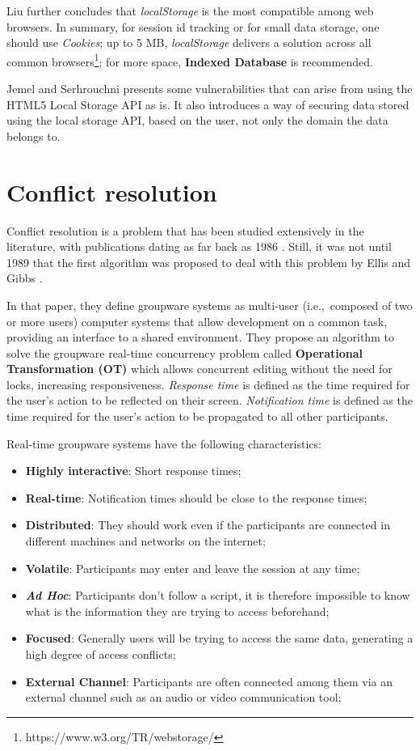 Liu further concludes that \textit{localStorage} is the most compatible among web browsers. In summary, for session id tracking or for small data storage, one should use \textit{Cookies}; up to 5 MB, \textit{localStorage} delivers a solution across all common browsers\footnote{https://www.w3.org/TR/webstorage/}; for more space, \textbf{Indexed Database} is recommended.

Jemel and Serhrouchni \cite{Jemel2014} presents some vulnerabilities that can arise from using the HTML5 Local Storage API as is. It also introduces a way of securing data stored using the local storage API, based on the user, not only the domain the data belongs to.


\section{Conflict resolution}\label{sec:conflict-res-sota}

Conflict resolution is a problem that has been studied extensively in the literature, with publications dating as far back as 1986 \cite{Greif1986}. Still, it was not until 1989 that the first algorithm was proposed to deal with this problem by Ellis and Gibbs \cite{Ellis1989}.

In that paper, they define groupware systems as multi-user (i.e.,\ composed of two or more users) computer systems that allow development on a common task, providing an interface to a shared environment. They propose an algorithm to solve the groupware real-time concurrency problem called \textbf{Operational Transformation (OT)} which allows concurrent editing without the need for locks, increasing responsiveness. \textit{Response time} is defined as the time required for the user's action to be reflected on their screen. \textit{Notification time} is defined as the time required for the user's action to be propagated to all other participants.

Real-time groupware systems have the following characteristics:

\begin{itemize}
    \item \textbf{Highly interactive}: Short response times;
    \item \textbf{Real-time}: Notification times should be close to the response times;
    \item \textbf{Distributed}: They should work even if the participants are connected in different machines and networks on the internet;
    \item \textbf{Volatile}: Participants may enter and leave the session at any time;
    \item \textbf{\textit{Ad Hoc}}: Participants don't follow a script, it is therefore impossible to know what is the information they are trying to access beforehand;
    \item \textbf{Focused}: Generally users will be trying to access the same data, generating a high degree of access conflicts;
    \item \textbf{External Channel}: Participants are often connected among them via an external channel such as an audio or video communication tool;
\end{itemize}

